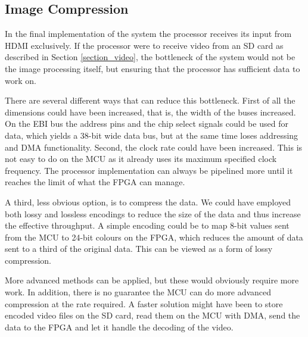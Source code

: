 \subsection{Image Compression}

In the final implementation of the system the processor receives its input from HDMI exclusively.
If the processor were to receive video from an SD card as described in Section \ref{section_video}, the bottleneck of the system would not be the image processing itself, but ensuring that the processor has sufficient data to work on.

There are several different ways that can reduce this bottleneck.
First of all the dimensions could have been increased, that is, the width of the buses increased.
On the EBI bus the address pins and the chip select signals could be used for data, which yields a 38-bit wide data bus, but at the same time loses addressing and DMA functionality.
Second, the clock rate could have been increased.
This is not easy to do on the MCU as it already uses its maximum specified clock frequency.
The processor implementation can always be pipelined more until it reaches the limit of what the FPGA can manage.

A third, less obvious option, is to compress the data.
We could have employed both lossy and lossless encodings to reduce the size of the data and thus increase the effective throughput.
A simple encoding could be to map 8-bit values sent from the MCU to 24-bit colours on the FPGA, which reduces the amount of data sent to a third of the original data.
This can be viewed as a form of lossy compression.

More advanced methods can be applied, but these would obviously require more work.
In addition, there is no guarantee the MCU can do more advanced compression at the rate required.
A faster solution might have been to store encoded video files on the SD card, read them on the MCU with DMA, send the data to the FPGA and let it handle the decoding of the video. 
